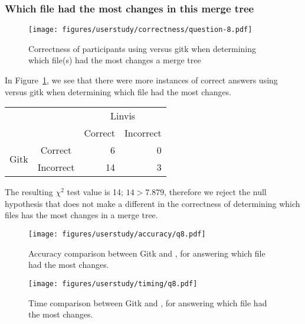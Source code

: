 \subsubsection{Which file had the most changes in this merge tree}
\label{ssub:which_file_had_the_most_changes_in_this_merge_tree}

\begin{figure}[htpb]
  \centering
  \texttt{[image: figures/userstudy/correctness/question-8.pdf]}
  \caption{Correctness of participants using \tool versus gitk when
    determining which file(s) had the most changes a merge tree}
  \label{fig:q_8_correctness}
\end{figure}

In Figure~\ref{fig:q_8_correctness}, we see that there were more
instances of correct answers using \tool versus gitk when determining
which file had the most changes.

\begin{center}
  \begin{tabular}{cc|rr}
                           &           & \multicolumn{2}{c}{Linvis}\\
                           &           & Correct                      & Incorrect\\\hline
    \multirow{2}{*}{Gitk}  & Correct   & 6                            & 0\\
                           & Incorrect & 14                           & 3\\
  \end{tabular}
\end{center}

The resulting $\chi^2$ test value is 14; $14 > 7.879$, therefore we
reject the null hypothesis that \tool does not make a different in the
correctness of determining which files has the most changes in a merge
tree.

\begin{figure}[htpb]
  \centering
  \texttt{[image: figures/userstudy/accuracy/q8.pdf]}
  \caption{Accuracy comparison between Gitk and \tool, for answering
    which file had the most changes.}
  \label{fig:q8_accuracy}
\end{figure}

\begin{figure}[htpb]
  \centering
  \texttt{[image: figures/userstudy/timing/q8.pdf]}
  \caption{Time comparison between Gitk and \tool, for answering which
    file had the most changes.}
  \label{fig:q8_timing}
\end{figure}

